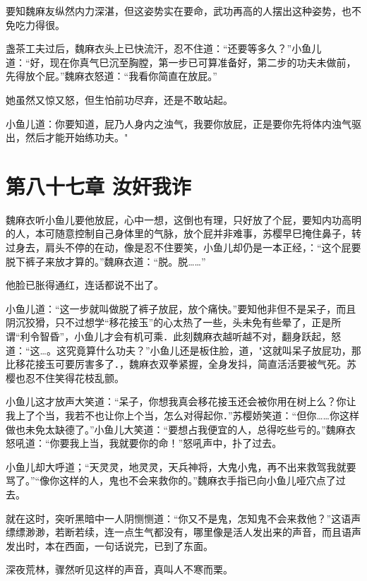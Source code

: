 \documentclass[12pt,oneside]{book}
\begin{document}
要知魏麻友纵然内力深湛，但这姿势实在要命，武功再高的人摆出这种姿势，也不免吃力得很。

盏茶工夫过后，魏麻衣头上已快流汗，忍不住道：``还要等多久？''小鱼儿道：``好，现在你真气巳沉至胸膛，第一步已可算准备好，第二步的功夫未做前，先得放个屁。''魏麻衣怒道：``我看你简直在放屁。''

她虽然又惊又怒，但生怕前功尽弃，还是不敢站起。

小鱼儿道：你要知道，屁乃人身内之浊气，我要你放屁，正是要你先将体内浊气驱出，然后才能开始练功夫。"

\hypertarget{ux7b2cux516bux5341ux4e03ux7ae0-ux6c5dux5978ux6211ux8bc8}{%
\chapter{第八十七章
汝奸我诈}\label{ux7b2cux516bux5341ux4e03ux7ae0-ux6c5dux5978ux6211ux8bc8}}

魏麻衣听小鱼儿要他放屁，心中一想，这倒也有理，只好放了个屁，要知内功高明的人，本可随意控制自己身体里的气脉，放个屁并非难事，苏樱早巳掩住鼻子，转过身去，肩头不停的在动，像是忍不住要笑，小鱼儿却仍是一本正经，：``这个屁要脱下裤子来放才算的。''魏麻衣道：``脱。脱\ldots\ldots{}''

他脸已胀得通红，连话都说不出了。

小鱼儿道：``这一步就叫做脱了裤子放屁，放个痛快。''要知他非但不是呆子，而且阴沉狡猾，只不过想学``移花接玉''的心太热了一些，头未免有些晕了，正是所谓``利令智昏''，小鱼儿才会有机可乘．此刻魏麻衣越听越不对，翻身跃起，怒道：``这\ldots。这究竟算什么功夫？''小鱼儿还是板住脸，道，"这就叫呆子放屁功，那比移花接玉可要厉害多了．，魏麻衣双拳紧握，全身发抖，简直活活要被气死。苏樱也忍不住笑得花枝乱颤。

小鱼儿这才放声大笑道：``呆子，你想我真会移花接玉还会被你用在树上么？你让我上了个当，我若不也让你上个当，怎么对得起你．''苏樱娇笑道：``但你\ldots\ldots 你这样做也未免太缺德了。''小鱼儿大笑道：``要想占我便宜的人，总得吃些亏的。''魏麻衣怒吼道：``你要我上当，我就要你的命！''怒吼声中，扑了过去。

小鱼儿却大呼道；``天灵灵，地灵灵，天兵神将，大鬼小鬼，再不出来救驾我就要骂了。''``像你这样的人，鬼也不会来救你的。''魏麻衣手指已向小鱼儿哑穴点了过去。

就在这时，突听黑暗中一人阴恻恻道：``你又不是鬼，怎知鬼不会来救他？''这语声缥缥渺渺，若断若续，连一点生气都没有，哪里像是活人发出来的声音，而且语声发出时，本在西面，一句话说完，已到了东面。

深夜荒林，骤然听见这样的声音，真叫人不寒而栗。
\end{document}
